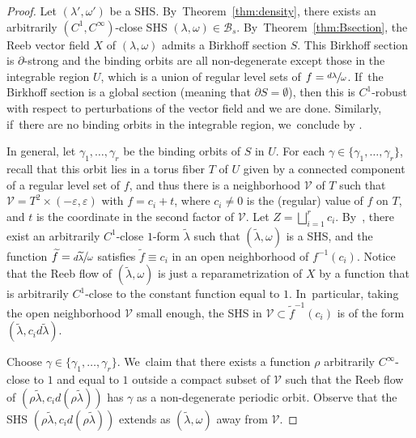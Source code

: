 \begin{proof}
Let $(\lambda',\omega')$ be a SHS. By~Theorem~\ref{thm:density}, there exists an arbitrarily $(C^1,C^\infty)$-close SHS $(\lambda,\omega) \in \mathcal{B}_s$. By~Theorem~\ref{thm:Bsection}, the Reeb vector field $X$ of $(\lambda,\omega)$ admits a Birkhoff section $S$. This Birkhoff section is $\partial$-strong and the binding orbits are all non-degenerate except those in the integrable region $U$, which is a union of regular level sets of $f=\sfrac{d\lambda}{\omega}$. If~the Birkhoff section is a global section (meaning that $\partial S=\emptyset$), then this is $C^1$-robust with respect to perturbations of the vector field and we are done. Similarly, if~there are no binding orbits in the integrable region, we~conclude by \cite[\S 5]{CDHR}.

In general, let $\gamma_1,\dots, \gamma_r$ be the binding orbits of $S$ in $U$. For each $\gamma\in \{\gamma_1,\dots, \gamma_r\}$, recall that this orbit lies in a torus fiber $T$ of $U$ given by a connected component of a regular level set of $f$, and thus there is a neighborhood $\mathcal{V}$ of $T$ such that $\mathcal{V}=T^2\times (-\varepsilon,\varepsilon)$ with $f=c_i+t$, where $c_i\neq 0$ is the (regular) value of $f$ on $T$, and $t$ is the coordinate in the second factor of $\mathcal{V}$. Let $Z=\bigsqcup_{i=1}^r c_i$. By~\cite[Prop.\,3.23]{CV1}, there exist an arbitrarily $C^1$-close $1$-form $\widetilde \lambda$ such that $(\widetilde \lambda, \omega)$ is a SHS, and the function $\widetilde f=\sfrac{d\widetilde \lambda}{\omega}$ satisfies $\widetilde f\equiv c_i$ in an open neighborhood of $f^{-1}(c_i)$. Notice that the Reeb flow of $(\widetilde \lambda, \omega)$ is just a reparametrization of $X$ by a function that is arbitrarily $C^1$-close to the constant function equal to $1$. In~particular, taking the open neighborhood $\mathcal{V}$ small enough, the SHS in $\mathcal{V}\subset \widetilde f^{-1}(c_i)$ is of the form $(\widetilde \lambda, c_i d\widetilde \lambda)$.\enlargethispage{.5\baselineskip}%

Choose $\gamma \in \{\gamma_1,\ldots, \gamma_r\}$. We~claim that there exists a function $\rho$ arbitrarily $C^\infty$\nobreakdash-close to $1$ and equal to $1$ outside a compact subset of $\mathcal V$ such that the Reeb flow of $(\rho\widetilde \lambda, c_i d (\rho \widetilde \lambda))$ has $\gamma$ as a non-degenerate periodic orbit. Observe that the SHS $(\rho\widetilde \lambda, c_i d (\rho \widetilde \lambda))$ extends as $(\widetilde \lambda, \omega)$ away from $\mathcal V$.


\end{proof}
